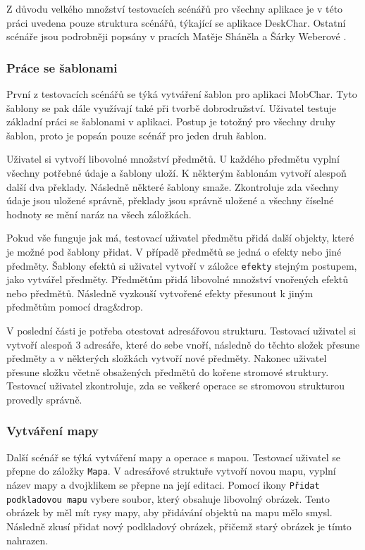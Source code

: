 \documentclass[thesis=B,czech]{resources/FITthesis}[2012/06/26]
\begin{document}
Z důvodu velkého množství testovacích scénářů pro všechny aplikace je v této práci uvedena pouze struktura scénářů, týkající se aplikace DeskChar. Ostatní scénáře jsou podrobněji popsány v pracích Matěje Sháněla \cite{Shanel_2017} a Šárky Weberové \cite{Weberova_2017}. 

\subsubsection{Práce se šablonami}
První z testovacích scénářů se týká vytváření šablon pro aplikaci MobChar. Tyto šablony se pak dále využívají také při tvorbě dobrodružství. Uživatel testuje základní práci se šablonami v aplikaci. Postup je totožný pro všechny druhy šablon, proto je popsán pouze scénář pro jeden druh šablon. \par

Uživatel si vytvoří libovolné množství předmětů. U každého předmětu vyplní všechny potřebné údaje a šablony uloží. K některým šablonám vytvoří alespoň další dva překlady. Následně některé šablony smaže. Zkontroluje zda všechny údaje jsou uložené správně, překlady jsou správně uložené a všechny číselné hodnoty se mění naráz na všech záložkách. \par

Pokud vše funguje jak má, testovací uživatel předmětu přidá další objekty, které je možné pod šablony přidat. V případě předmětů se jedná o efekty nebo jiné předměty. Šablony efektů si uživatel vytvoří v záložce \texttt{efekty} stejným postupem, jako vytvářel předměty. Předmětům přidá libovolné množství vnořených efektů nebo předmětů. Následně vyzkouší vytvořené efekty přesunout k jiným předmětům pomocí drag\&drop. \par 

V poslední části je potřeba otestovat adresářovou strukturu. Testovací uživatel si vytvoří alespoň 3 adresáře, které do sebe vnoří, následně do těchto složek přesune předměty a v některých složkách vytvoří nové předměty. Nakonec uživatel přesune složku včetně obsažených předmětů do kořene stromové struktury. Testovací uživatel zkontroluje, zda se veškeré operace se stromovou strukturou provedly správně. 

\subsubsection{Vytváření mapy}
Další scénář se týká vytváření mapy a operace s mapou.  Testovací uživatel se přepne do záložky \texttt{Mapa}. V adresářové struktuře vytvoří novou mapu, vyplní název mapy a dvojklikem se přepne na její editaci. Pomocí ikony \texttt{Přidat podkladovou mapu} vybere soubor, který obsahuje libovolný obrázek. Tento obrázek by měl mít rysy mapy, aby přidávání objektů na mapu mělo smysl. Následně zkusí přidat nový podkladový obrázek, přičemž starý obrázek je tímto nahrazen. \par
\end{document}
